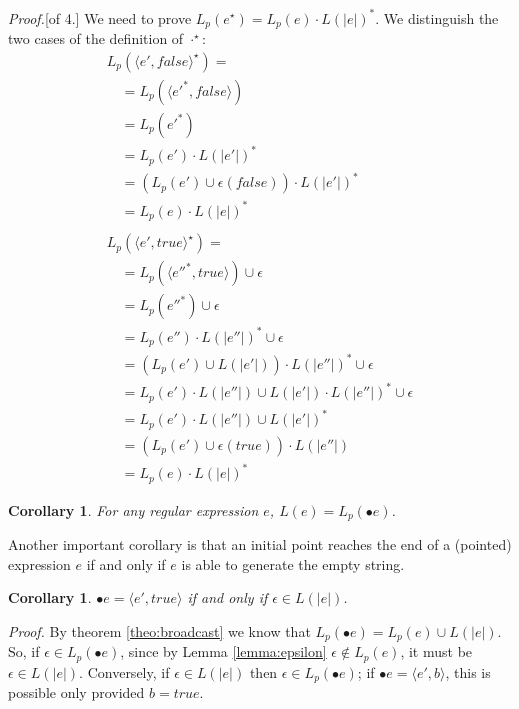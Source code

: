 \documentclass[preprint]{sigplanconf}
\newcommand{\true}{\mathit{true}}
\newcommand{\false}{\mathit{false}}
\newcommand{\varoast}{\star}
\newcommand{\Le}[1]{L(#1)}
\newcommand{\Lp}[1]{L_p(#1)}
\newcounter{item}
\newtheorem{corollary}[item]{Corollary}
\newenvironment{proof}{\begin{trivlist}\item[]{\em Proof.}}{\end{trivlist}}
\begin{document}
\begin{proof}[of 4.]
We need to prove
$L_p(e^\varoast) = L_p(e) \cdot L(|e|)^*$.
We distinguish the two cases of the definition of $\cdot^\varoast$:
$$\begin{array}{l}
L_p(\langle e',\false \rangle^\varoast) = \\
\quad = L_p(\langle e'^*,\false \rangle) \\
\quad = L_p(e'^*) \\
\quad = L_p(e')\cdot L(|e'|)^* \\
\quad = (L_p(e') \cup \epsilon(\false))\cdot L(|e'|)^* \\
\quad = L_p(e)\cdot L(|e|)^*\\\\
L_p(\langle e',true \rangle^\varoast) = \\
\quad = L_p(\langle e''^*,true \rangle) \cup \epsilon \\
\quad = L_p(e''^*) \cup \epsilon \\
\quad = L_p(e'')\cdot L(|e''|)^* \cup \epsilon \\
\quad = (L_p(e') \cup L(|e'|))\cdot L(|e''|)^* \cup \epsilon \\
\quad = L_p(e')\cdot L(|e''|) \cup L(|e'|)\cdot L(|e''|)^* \cup \epsilon \\
\quad = L_p(e')\cdot L(|e''|) \cup L(|e'|)^* \\
\quad = (L_p(e') \cup \epsilon(\true))\cdot L(|e''|) \\
\quad = L_p(e)\cdot L(|e|)^*
\end{array}$$
\end{proof}

\begin{corollary}
\label{corollary:Lpbullet}
For any regular expression $e$, $\Le e = \Lp{\bullet e}$.
\end{corollary}

Another important corollary is that an initial point reaches 
the end of a (pointed) expression
$e$ if and only if $e$ is able to generate the empty
string.

\begin{corollary}
\label{nullable}
$\bullet e = \langle e', \true \rangle$ if and only if
$\epsilon \in \Le{|e|}$.
\end{corollary}
\begin{proof}
By theorem \ref{theo:broadcast} we know
that $\Lp{\bullet e} =\Lp e \cup \Le{|e|}$. So, if 
$\epsilon \in \Lp{\bullet e}$, since by Lemma \ref{lemma:epsilon} 
$\epsilon \not\in \Lp e$, it must be $\epsilon \in \Le{|e|}$.
Conversely, if $\epsilon \in \Le{|e|}$ then $\epsilon \in 
\Lp{\bullet e}$; if
$\bullet e = \langle e', b \rangle$, this is possible only 
provided $b=true$.
\end{proof}
\end{document}
